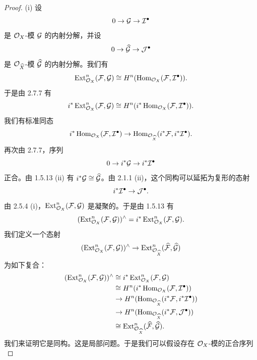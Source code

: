 \begin{proof}
(i) 设
\begin{equation*}
0\to\cG\to\cI^{\bullet}
\end{equation*}
是 $\cO_X$-模 $\cG$ 的内射分解，并设
\begin{equation*}
0\to\widehat{\cG}\to\cJ^{\bullet}
\end{equation*}
是 $\cO_{\widehat{X}}$-模 $\widehat{\cG}$ 的内射分解。我们有
\begin{equation*}
\Ext^n_{\cO_X}(\cF,\cG)\cong H^n(\Hom_{\cO_X}(\cF,\cI^{\bullet})).
\end{equation*}
于是由 2.7.7 有
\begin{equation*}
i^*\Ext^n_{\cO_X}(\cF,\cG)\cong H^n(i^*\Hom_{\cO_X}(\cF,\cI^{\bullet})).
\end{equation*}
我们有标准同态
\begin{equation*}
i^*\Hom_{\cO_X}(\cF,\cI^{\bullet})\to\Hom_{\cO_{\widehat{X}}}(i^*\cF,i^*\cI^{\bullet}).
\end{equation*}
再次由 2.7.7，序列
\begin{equation*}
0\to i^*\cG\to i^*\cI^{\bullet}
\end{equation*}
正合。由 1.5.13 (ii) 有 $i^*\cG\cong\widehat{\cG}$。由 2.1.1 (ii)，这个同构可以延拓为复形的态射
\begin{equation*}
i^*\cI^{\bullet}\to\cJ^{\bullet}.
\end{equation*}
由 2.5.4 (i)，$\Ext^n_{\cO_X}(\cF,\cG)$ 是凝聚的。于是由 1.5.13 有
\begin{equation*}
(\Ext^n_{\cO_X}(\cF,\cG))^{\wedge}=i^*\Ext^n_{\cO_X}(\cF,\cG).
\end{equation*}
我们定义一个态射
\begin{equation*}
(\Ext^n_{\cO_X}(\cF,\cG))^{\wedge}\to\Ext^n_{\cO_{\widehat{X}}}(\widehat{\cF},\widehat{\cG})
\end{equation*}
为如下复合：
\begin{align*}
(\Ext^n_{\cO_X}(\cF,\cG))^{\wedge}&\cong i^*\Ext^n_{\cO_X}(\cF,\cG)\\
&\cong H^n(i^*\Hom_{\cO_X}(\cF,\cI^{\bullet}))\\
&\to H^n(\Hom_{\cO_{\widehat{X}}}(i^*\cF,i^*\cI^{\bullet}))\\
&\to H^n(\Hom_{\cO_{\widehat{X}}}(i^*\cF,\cJ^{\bullet}))\\
&\cong\Ext^n_{\cO_{\widehat{X}}}(\widehat{\cF},\widehat{\cG}).
\end{align*}
我们来证明它是同构。这是局部问题。于是我们可以假设存在 $\cO_X$-模的正合序列
\begin{equation*}

\end{equation*}
\end{proof}
